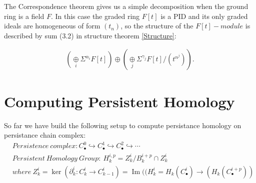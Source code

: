 \documentclass[11pt,a4paper]{report}
\DeclareMathOperator{\Ima}{Im}
\begin{document}
            The Correspondence theorem gives us a simple decomposition when the ground ring is a field $F$. In this case the graded ring $F[t]$ is a PID and its only graded ideals are homogeneous of form $(t_n)$, so the structure of the $F[t]-module$ is described by sum (3.2) in structure theorem \ref{Structure}:
            
            \begin{align}
                (\underset{i}{\oplus} \Sigma^{\alpha_i} F[t]) \oplus (\underset{j}{\oplus} \Sigma ^{\gamma_j} F[t]/(t^{n^j})).
              \end{align}
              
              
              
              
            \chapter{Computing Persistent Homology}
            
            So far we have build the following setup to compute persistance homology on persistance chain complex:
              \begin{align*}
                &Persistence \ complex: C_\bullet^0 \hookrightarrow C_\bullet^1 \hookrightarrow C_\bullet^2 \hookrightarrow \cdots\\
                &Persistent \ Homology \ Group: \ H_k^{i,p} = Z_k^i / B_k^{i+p} \cap Z_k^i\\
                & where \ Z_k^i = \ker (\partial_k^i : C_k^i \rightarrow C_{k-1}^i)
                =\Ima ((H_k^i = H_k ( C_\bullet^i) \rightarrow (H_k ( C_\bullet^{i+p}))\\
              \end{align*}
              
\end{document}
